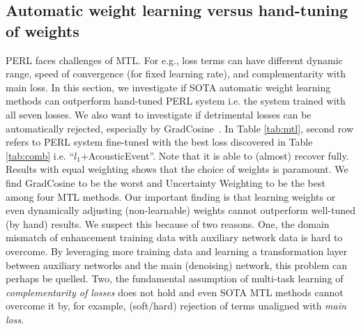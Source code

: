 \documentclass{article}
\begin{document}
\vspace{-3mm}
\subsection{Automatic weight learning versus hand-tuning of weights}
\label{sec:multi}
PERL faces challenges of MTL. For e.g., loss terms can have different dynamic range, speed of convergence (for fixed learning rate), and complementarity with main loss.
In this section, we investigate if \ac{SOTA} automatic weight learning methods can outperform hand-tuned PERL system i.e. the system trained with all seven losses.
We also want to investigate if detrimental losses can be automatically rejected, especially by GradCosine~\cite{du2018adapting}.
In Table \ref{tab:mtl}, second row refers to PERL system fine-tuned with the best loss discovered in Table \ref{tab:comb} i.e. ``$l_1$+AcousticEvent''.
Note that it is able to (almost) recover fully.
Results with equal weighting shows that the choice of weights is paramount.
We find GradCosine to be the worst and Uncertainty Weighting to be the best among four \ac{MTL} methods.
Our important finding is that learning weights or even dynamically adjusting (non-learnable) weights cannot outperform well-tuned (by hand) results.
We suspect this because of two reasons.
One, the domain mismatch of enhancement training data with auxiliary network data is hard to overcome.
By leveraging more training data and learning a transformation layer between auxiliary networks and the main (denoising) network, this problem can perhaps be quelled.
Two, the fundamental assumption of multi-task learning of \emph{complementarity of losses} does not hold and even SOTA MTL methods cannot overcome it by, for example, (soft/hard) rejection of terms unaligned with \emph{main loss}.



\vspace{2mm}
\end{document}
